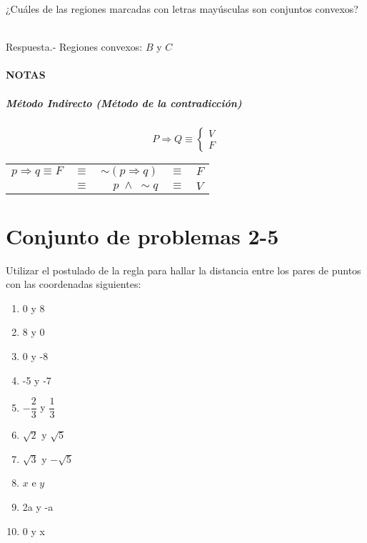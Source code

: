 \begin{ejem}
¿Cuáles de las regiones marcadas con letras mayúsculas son conjuntos convexos?\\\\
\begin{center}
\begin{tikzpicture}

\end{tikzpicture}
\end{center}
Respuesta.- \; Regiones convexos: $B$ y $C$
\end{ejem}



\paragraph{NOTAS}
\subparagraph{Método Indirecto (Método de la contradicción)}
$$P \Rightarrow Q  \equiv \left\lbrace
\begin{array}{l}
 V\\
F
\end{array}
\right.$$
\begin{center}
\begin{tabular}{r c r c l}
$p \Rightarrow q \equiv F$&$\equiv$&$\sim (p \Rightarrow q)$&$\equiv$&$F$\\
&$\equiv$&$p \; \land \; \sim q$&$\equiv$&$V$\\
\end{tabular}
\end{center}

\section{Conjunto de problemas 2-5}
\begin{prob}
Utilizar el postulado de la regla para hallar la distancia entre los pares de puntos con las coordenadas siguientes:
\begin{enumerate}[\bfseries a)]
\item 0 y 8\\
\item 8 y 0\\
\item 0 y -8\\
\item -5 y -7\\
\item $- \dfrac{2}{3}$ y $\dfrac{1}{3}$\\
\item $\sqrt{2}$ y $\sqrt{5}$\\
\item $\sqrt{3}$ y $- \sqrt{5}$\\
\item $x$ e $y$\\
\item 2a y -a\\
\item 0 y x\\
\end{enumerate}
\end{prob}